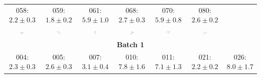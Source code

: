 \begin{tabular}{|c c c c c c c|}
{\scriptsize 058: $ 2.2 \pm 0.3 $ } & {\scriptsize 059: $ 1.8 \pm 0.2 $ } & {\scriptsize 061: $ 5.9 \pm 1.0 $ } & {\scriptsize 068: $ 2.7 \pm 0.3 $ } & {\scriptsize 070: $ 5.9 \pm 0.8 $ } & {\scriptsize 080: $ 2.6 \pm 0.2 $ } & \\ 
\includegraphics[width = 0.14\textwidth]{2DImages/SAMPL5_058.pdf} & \includegraphics[width = 0.14\textwidth]{2DImages/SAMPL5_059.pdf} & \includegraphics[width = 0.14\textwidth]{2DImages/SAMPL5_061.pdf} & \includegraphics[width = 0.14\textwidth]{2DImages/SAMPL5_068.pdf} & \includegraphics[width = 0.14\textwidth]{2DImages/SAMPL5_070.pdf} & \includegraphics[width = 0.14\textwidth]{2DImages/SAMPL5_080.pdf} & \\ 
\hline 
\multicolumn{7}{|c|}{{\small\textbf{Batch 1}}}\\ 
{\scriptsize 004: $ 2.3 \pm 0.3 $ } & {\scriptsize 005: $ 2.6 \pm 0.3 $ } & {\scriptsize 007: $ 3.1 \pm 0.4 $ } & {\scriptsize 010: $ 7.8 \pm 1.6 $ } & {\scriptsize 011: $ 7.1 \pm 1.3 $ } & {\scriptsize 021: $ 2.2 \pm 0.2 $ } & {\scriptsize 026: $ 8.0 \pm 1.7 $ } \\ 

\end{tabular}
